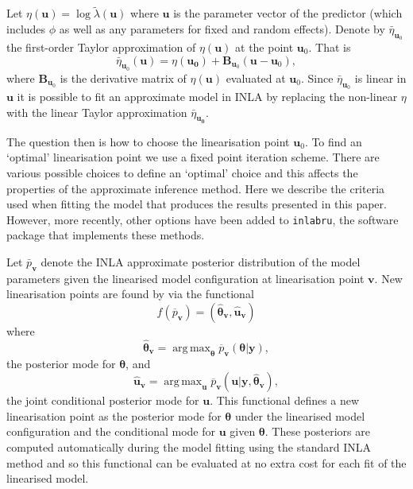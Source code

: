 \documentclass{statsoc}
\newcommand{\ol}[1]{\overline{#1}}
\newcommand{\wh}[1]{\widehat{#1}}
\newcommand{\bm}{\boldsymbol}  %
\DeclareMathOperator*{\argmax}{arg\,max}  %
\begin{document}
Let $\eta(\bm{u}) = \log \tilde{\lambda}(\bm{u})$ where $\bm{u}$ is the parameter vector of the predictor (which includes $\phi$ as well as any parameters for fixed and random effects).  Denote by $\bar{\eta}_{\bm{u}_0}$ the first-order Taylor approximation of $\eta(\bm{u})$ at the point $\bm{u}_0$.  That is
\begin{equation*}
\bar{\eta}_{\bm{u}_0} (\bm{u}) = \eta(\bm{u_0}) + \bm{B}_{\bm{u}_0}(\bm{u} - \bm{u}_0),
\end{equation*}
where $\bm{B}_{\bm{u}_0}$ is the derivative matrix of $\eta(\bm{u})$ evaluated at $\bm{u}_0$.  Since $\bar{\eta}_{\bm{u}_0}$ is linear in $\bm{u}$ it is possible to fit an approximate model in INLA by replacing the non-linear $\eta$ with the linear Taylor approximation $\bar{\eta}_{\bm{u_0}}$.   

The question then is how to choose the linearisation point $\bm{u}_0$.  To find an `optimal' linearisation point we use a fixed point iteration scheme.  There are various possible choices to define an `optimal' choice and this affects the properties of the approximate inference method.  Here we describe the criteria used when fitting the model that produces the results presented in this paper.  However, more recently, other options have been added to \texttt{inlabru}, the software package that implements these methods.

Let $\bar{p}_{\bm{v}}$ denote the INLA approximate posterior distribution of the model parameters given the linearised model configuration at linearisation point $\bm{v}$.  New linearisation points are found by via the functional
\begin{equation}
	f(\ol{p}_{\bm{v}}) = (\wh{\bm{\theta}}_{\bm{v}},\wh{\bm{u}}_{\bm{v}})
\end{equation}
where
\begin{equation}
\wh{\bm{\theta}}_{\bm{v}} = \argmax_{\bm{\theta}} \ol{p}_{\bm{v}} ( \bm{\theta} | \bm{y}),
\end{equation}
the posterior mode for $\bm{\theta}$, and
\begin{equation}
\wh{\bm{u}}_{\bm{v}} = \argmax_{\bm{u}} \ol{p}_{\bm{v}} (\bm{u} | \bm{y}, \wh{\bm{\theta}}_{\bm{v}}),
\end{equation}
the joint conditional posterior mode for $\bm{u}$.  This functional defines a new linearisation point as the posterior mode for $\bm{\theta}$ under the linearised model configuration and the conditional mode for $\bm{u}$ given $\bm{\theta}$.  These posteriors are computed automatically during the model fitting using the standard INLA method and so this functional can be evaluated at no extra cost for each fit of the linearised model.
\end{document}
